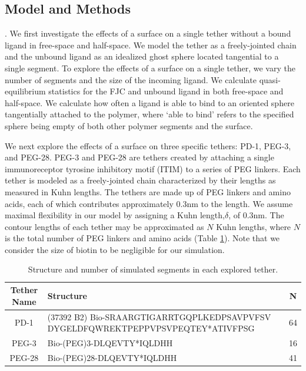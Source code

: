 \documentclass[../../AdvancementSummary.tex]{subfiles}
\begin{document}
\subsection{Model and Methods}
. 
We first investigate the effects of a surface on a single tether without a bound ligand in free-space and half-space. We model the tether as a freely-jointed chain and the unbound ligand as an idealized ghost sphere located tangential to a single segment. To explore the effects of a surface on a single tether, we vary the number of segments and the size of the incoming ligand. We calculate quasi-equilibrium statistics for the FJC and unbound ligand in both free-space and half-space. We calculate how often a ligand is able to bind to an oriented sphere tangentially attached to the polymer, where `able to bind' refers to the specified sphere being empty of both other polymer segments and the surface. 

We next explore the effects of a surface on three specific tethers: PD-1, PEG-3, and PEG-28. PEG-3 and PEG-28 are tethers created by attaching a single immunoreceptor tyrosine inhibitory motif (ITIM) to a series of PEG linkers. Each tether is modeled as a freely-jointed chain characterized by their lengths as measured in Kuhn lengths. The tethers are made up of PEG linkers and amino acids, each of which contributes approximately 0.3nm to the length. We assume maximal flexibility in our model by assigning a Kuhn length,$\delta$, of 0.3nm. The contour lengths of each tether may be approximated as $N$ Kuhn lengths, where $N$ is the total number of PEG linkers and amino acids (Table \ref{table: Tethers}). Note that we consider the size of biotin to be negligible for our simulation. 

\begin{table}
\caption{Structure and number of simulated segments in each explored tether. \label{table: Tethers}}
\begin{center}
\begin{tabular}{| c | p{10cm} | c |}
    \hline
        Tether Name & Structure & N \\ 
        \hline 
        PD-1    &   (37392 B2) Bio-SRAARGTIGARRTGQPLKEDPSAVPVFSV
                    DYGELDFQWREKTPEPPVPSVPEQTEY*ATIVFPSG            &   64   \\
        PEG-3   &   Bio-(PEG)3-DLQEVTY*IQLDHH                           &   16   \\ 
        PEG-28  &   Bio-(PEG)28-DLQEVTY*IQLDHH                          &   41   \\
    \hline
\end{tabular}
\end{center}
\end{table}
\end{document}
